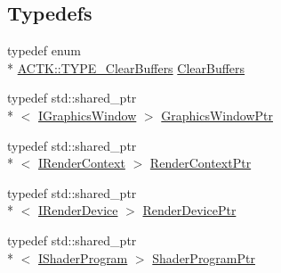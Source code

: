 \subsection*{Typedefs}
\begin{DoxyCompactItemize}
\item 
typedef enum \\*
\hyperlink{namespace_a_c_t_k_ac45d1ac10b65556ebdc2e3651faf0ac4}{A\-C\-T\-K\-::\-T\-Y\-P\-E\-\_\-\-Clear\-Buffers} \hyperlink{namespace_a_c_t_k_ac7a4b20bfb9290a45d05a8086fd0e81e}{Clear\-Buffers}
\item 
typedef std\-::shared\-\_\-ptr\\*
$<$ \hyperlink{class_a_c_t_k_1_1_i_graphics_window}{I\-Graphics\-Window} $>$ \hyperlink{namespace_a_c_t_k_a73ab07fc6a568d003d19f3ed14ea7143}{Graphics\-Window\-Ptr}
\item 
typedef std\-::shared\-\_\-ptr\\*
$<$ \hyperlink{class_a_c_t_k_1_1_i_render_context}{I\-Render\-Context} $>$ \hyperlink{namespace_a_c_t_k_a7030f603b6015e2f7c08ab1cc584d084}{Render\-Context\-Ptr}
\item 
typedef std\-::shared\-\_\-ptr\\*
$<$ \hyperlink{class_a_c_t_k_1_1_i_render_device}{I\-Render\-Device} $>$ \hyperlink{namespace_a_c_t_k_a456b9e135a6c2d4a753f35fe9b5ac009}{Render\-Device\-Ptr}
\item 
typedef std\-::shared\-\_\-ptr\\*
$<$ \hyperlink{class_a_c_t_k_1_1_i_shader_program}{I\-Shader\-Program} $>$ \hyperlink{namespace_a_c_t_k_a34512c71be222dc06a2906d6c00d2c4f}{Shader\-Program\-Ptr}
\end{DoxyCompactItemize}
